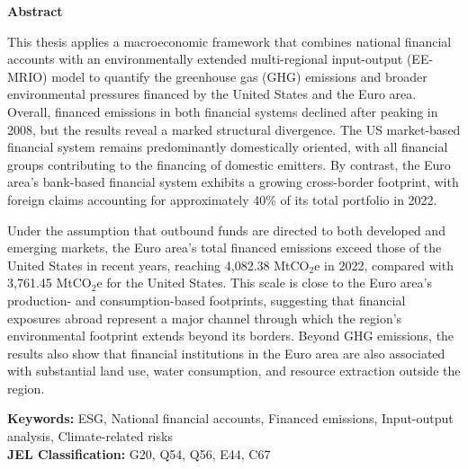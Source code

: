 \documentclass[
11pt, %
oneside, %
english, %
singlespacing, %
headsepline, %
]{MastersDoctoralThesis} %
\begin{document}

\clearpage
\thispagestyle{empty} %

\begin{center}
    \LARGE \textbf{Abstract}
\end{center}
\vspace{1cm}

This thesis applies a macroeconomic framework that combines national financial accounts with an environmentally extended multi-regional input-output (EE-MRIO) model to quantify the greenhouse gas (GHG) emissions and broader environmental pressures financed by the United States and the Euro area. Overall, financed emissions in both financial systems declined after peaking in 2008, but the results reveal a marked structural divergence. The US market-based financial system remains predominantly domestically oriented, with all financial groups contributing to the financing of domestic emitters. By contrast, the Euro area’s bank-based financial system exhibits a growing cross-border footprint, with foreign claims accounting for approximately 40\% of its total portfolio in 2022.

Under the assumption that outbound funds are directed to both developed and emerging markets, the Euro area’s total financed emissions exceed those of the United States in recent years, reaching 4,082.38 MtCO$_2$e in 2022, compared with 3,761.45 MtCO$_2$e for the United States. This scale is close to the Euro area’s production- and consumption-based footprints, suggesting that financial exposures abroad represent a major channel through which the region’s environmental footprint extends beyond its borders. Beyond GHG emissions, the results also show that financial institutions in the Euro area are also associated with substantial land use, water consumption, and resource extraction outside the region. 



\vspace{1.5cm}

\noindent \textbf{Keywords:} ESG, National financial accounts, Financed emissions, Input-output analysis, Climate-related risks \\
\textbf{JEL Classification:} G20, Q54, Q56, E44, C67

\cleardoublepage
\end{document}
